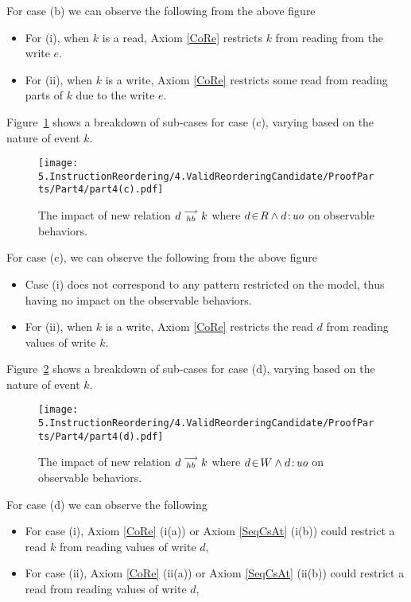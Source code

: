     For case (b) we can observe the following from the above figure 
    \begin{itemize}
        \item For (i), when $k$ is a read, Axiom \ref{CoRe} restricts $k$ from reading from the write $e$. 
        \item For (ii), when $k$ is a write, Axiom \ref{CoRe} restricts some read from reading parts of $k$ due to the write $e$.   
    \end{itemize}

    Figure~\ref{reord:case3} shows a breakdown of sub-cases for case (c), varying based
    on the nature of event $k$.
    \begin{figure}[H]
        \centering
        \texttt{[image: 5.InstructionReordering/4.ValidReorderingCandidate/ProofParts/Part4/part4(c).pdf]}
        \caption{The impact of new relation $d\stackrel{\longrightarrow}{_{hb}}k$ where $d\!\in\!R \wedge d\!:\!\textit{uo}$ on observable behaviors.}
        \label{reord:case3}
    \end{figure}
    
    For case (c), we can observe the following from the above figure
    \begin{itemize}
        \item Case (i) does not correspond to any pattern restricted on the model, thus having no impact on the observable behaviors. 
        \item For (ii), when $k$ is a write, Axiom \ref{CoRe} restricts the read $d$ from reading values of write $k$. 
    \end{itemize}

    Figure~\ref{reord:case4} shows a breakdown of sub-cases for case (d), varying based
    on the nature of event $k$.
    \begin{figure}[H]
        \centering
        \texttt{[image: 5.InstructionReordering/4.ValidReorderingCandidate/ProofParts/Part4/part4(d).pdf]}
        \caption{The impact of new relation $d\stackrel{\longrightarrow}{_{hb}}k$ where $d\!\in\!W \wedge d\!:\!\textit{uo}$ on observable behaviors.}
        \label{reord:case4}
    \end{figure}

    For case (d) we can observe the following 
    \begin{itemize}
        \item For case (i), Axiom \ref{CoRe} (i(a)) or Axiom \ref{SeqCsAt} (i(b)) could restrict a read $k$ from reading values of write $d$, 
        \item For case (ii), Axiom \ref{CoRe} (ii(a)) or Axiom \ref{SeqCsAt} (ii(b)) could restrict a read from reading values of write $d$, 
    \end{itemize}
  
